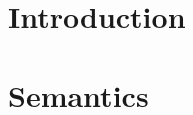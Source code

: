 \documentclass[12pt,letterpaper]{report}
\begin{document}
\chapter{Introduction}

\chapter{Semantics}

\end{document}
